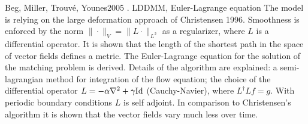 {Beg, Miller, Trouvé, Younes}{2005}
{\cite{Beg2005Computing}. LDDMM, Euler-Lagrange equation}
{The model is relying on the large deformation approach of Christensen 1996.
 Smoothness is enforced by the norm $\|\cdot\|_V = \|L\cdot\|_{L^2}$ as a regularizer, where $L$ is a differential operator. It is shown that the length of the shortest path in the space of vector fields defines a metric. The Euler-Lagrange equation for the solution of the matching problem is derived. Details of the algorithm are explained: a semi-lagrangian method for integration of the flow equation; the choice of the differential operator $L = -\alpha\nabla^2 + \gamma\mathrm{Id}$ (Cauchy-Navier), where $L^\dag L f = g$. With periodic boundary conditions $L$ is self adjoint.
 In comparison to Christensen's algorithm it is shown that the vector fields vary much less over time.}